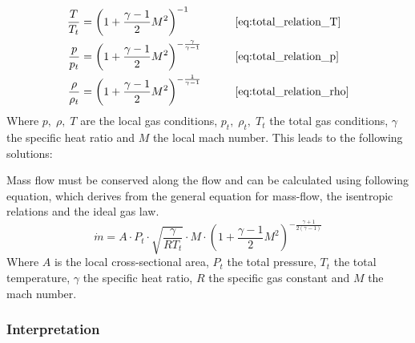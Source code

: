 \begin{alignat*}{2}
    \frac{T}{T_t}   & = \left( 1 + \frac{\gamma - 1}{2} M^2 \right)^{-1}
    & \qquad & \eqref{eq:total_relation_T} \\
    \frac{p}{p_t}   & = \left( 1 + \frac{\gamma - 1}{2} M^2 \right)^{-\frac{\gamma}{\gamma - 1}}
    & \qquad & \eqref{eq:total_relation_p} \\
    \frac{\rho}{\rho_t} & = \left( 1 + \frac{\gamma - 1}{2} M^2 \right)^{-\frac{1}{\gamma - 1}}
    & \qquad & \eqref{eq:total_relation_rho}
\end{alignat*}
Where $p,\; \rho,\; T$ are the local gas conditions, $p_t,\; \rho_t,\; T_t$ the total gas conditions, $\gamma$ the specific heat ratio and $M$ the local mach number.
This leads to the following solutions:

Mass flow must be conserved along the flow and can be calculated using following equation, which derives from the general equation for mass-flow, the isentropic relations and the ideal gas law.
\cite{benson_mass_nodate}
$$
	\dot{m} = A \cdot P_t \cdot \sqrt{\frac{\gamma}{R T_t}} \cdot M \cdot \left(1 + \frac{\gamma - 1}{2} M^2\right)^{-\frac{\gamma + 1}{2(\gamma - 1)}}
$$
Where $A$ is the local cross-sectional area, $P_t$ the total pressure, $T_t$ the total temperature, $\gamma$ the specific heat ratio, $R$ the specific gas constant and $M$ the mach number.
\cite{Cantwell_AA210A}

\subsubsection*{Interpretation}
